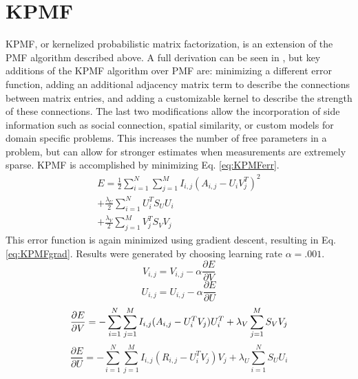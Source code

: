 \documentclass[journal]{IEEEtran}
\begin{document}
\section{KPMF}
KPMF, or kernelized probabilistic matrix factorization, is an extension of the PMF algorithm described above. A full derivation can be seen in 
\cite{KPMFpaper}, but key additions of the KPMF algorithm over PMF are: minimizing a different error function, adding an additional adjacency 
matrix term to describe the connections between matrix entries, and adding a customizable kernel to describe the strength of these connections. The last
two modifications allow the incorporation of side information such as social connection, spatial similarity, or custom models for domain specific
problems. This increases the number of free parameters in a problem, but can allow for stronger estimates when measurements are 
extremely sparse. KPMF is accomplished by minimizing Eq. \ref{eq:KPMFerr}.
\begin{align}
    E=\frac{1}{2}\sum\limits_{i=1}^N\sum\limits_{j=1}^MI_{i,j}(A_{i,j}-U_iV_j^T)^2 \nonumber \\
    +\frac{\lambda_U}{2}\sum\limits_{i=1}^NU^T_iS_UU_i \nonumber \\
    + \frac{\lambda_V}{2}\sum\limits_{j=1}^MV^T_jS_VV_j
\label{eq:KPMFerr}
\end{align}
This error function is again minimized using gradient descent, resulting in Eq. \ref{eq:KPMFgrad}. Results were generated by choosing learning rate 
\begin{math}\alpha = .001\end{math}.
\begin{equation}
    V_{i,j} = V_{i,j} - \alpha\frac{\partial E}{\partial V} \nonumber
\end{equation}
\begin{equation}
    U_{i,j} = U_{i,j} - \alpha\frac{\partial E}{\partial U} \nonumber
\end{equation}
\begin{equation}
    \frac{\partial E}{\partial V} = -\sum\limits_{i=1}^N\sum\limits_{j=1}^MI_{i,j}(A_{i,j}-U_i^TV_j)U_i^T + \lambda_V\sum\limits_{j=1}^MS_VV_j \nonumber \\
\end{equation}
\begin{equation}
    \frac{\partial E}{\partial U} = -\sum\limits_{i=1}^N\sum\limits_{j=1}^MI_{i,j}(R_{i,j}-U_i^TV_j)V_j + \lambda_U\sum\limits_{i=1}^NS_UU_i
    \label{eq:KPMFgrad}
\end{equation}
\end{document}
